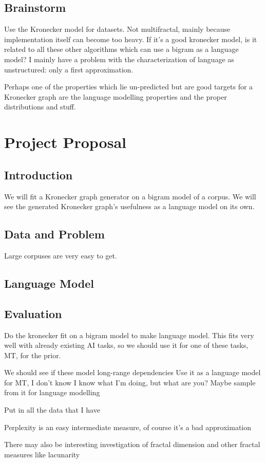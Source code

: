 \documentclass[12pt]{article}
\begin{document}
\subsection{Brainstorm}

Use the Kronecker model for datasets. Not multifractal, mainly because implementation itself can become too heavy. If it's a good kronecker model, is it related to all these other algorithms which can use a bigram as a language model? I mainly have a problem with the characterization of language as unstructured: only a first approximation.

Perhaps one of the properties which lie un-predicted but are good targets for a Kronecker graph are the language modelling properties and the proper distributions and stuff.

\section{Project Proposal}

\subsection{Introduction}
We will fit a Kronecker graph generator on a bigram model of a corpus. We will see the generated Kronecker graph's usefulness as a language model on its own.
\subsection{Data and Problem}
Large corpuses are very easy to get. %
\subsection{Language Model}
\subsection{Evaluation}
Do the kronecker fit on a bigram model to make language model. This fits very well with already existing AI tasks, so we should use it for one of these tasks, MT, for the prior.

We should see if these model long-range dependencies
Use it as a language model for MT, I don't know
I know what I'm doing, but what are you?
Maybe sample from it for language modelling

Put in all the data that I have

Perplexity is an easy intermediate measure, of course it's a bad approximation

There may also be interesting investigation of fractal dimension and other fractal measures like lacunarity

\end{document}

